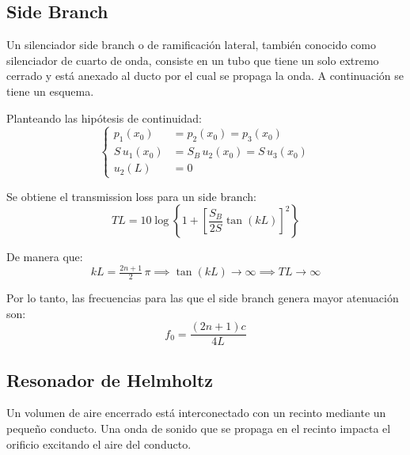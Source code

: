 \documentclass[a5paper,12pt,twoside]{book}
\begin{document}
\subsection{Side Branch} 

Un silenciador side branch o de ramificación lateral, también conocido como silenciador de cuarto de onda, consiste en un tubo que tiene un solo extremo cerrado y está anexado al ducto por el cual se propaga la onda.
A continuación se tiene un esquema.

\begin{center}
    \def\svgwidth{\linewidth}
    
\end{center}

Planteando las hipótesis de continuidad:
\begin{equation*}
    \left\{
    \begin{aligned}
        p_1(x_0) &= p_2(x_0) = p_3(x_0)
        \\
        S \, u_1 (x_0) &= S_B \, u_2 (x_0) = S \, u_3 (x_0)
        \\
        u_2(L) &= 0
    \end{aligned}
    \right.
\end{equation*}

Se obtiene el transmission loss para un side branch:
\begin{equation*}
    TL = 10 \log \left\{ 1 + \left[ \frac{S_B}{2S} \tan (kL) \right]^2 \right\}
\end{equation*}

De manera que:
\begin{equation*}
    kL = \tfrac{2n+1}{2} \, \pi \implies \tan (kL) \to \infty \implies TL\to\infty
\end{equation*}

Por lo tanto, las frecuencias para las que el side branch genera mayor atenuación son:
\begin{equation*}
    f_0 = \frac{\left( 2n+1 \right) c}{4L}
\end{equation*}


\subsection{Resonador de Helmholtz}

Un volumen de aire encerrado está interconectado con un recinto mediante un pequeño conducto.
Una onda de sonido que se propaga en el recinto impacta el orificio excitando el aire del conducto.
\end{document}
